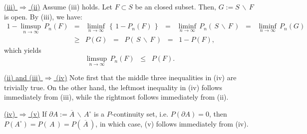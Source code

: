 \vskip 0.3cm
\noindent
\underline{(iii) $\Longrightarrow$ (ii)}
\vskip 0.2cm
\noindent
Assume (iii) holds. Let $F \subset S$ be an closed subset.
Then, $G := S\,\backslash\,F$ is open. By (iii), we have:
\begin{eqnarray*}
1 - \limsup_{n\rightarrow\infty}\,P_{n}\!\left(F\right)
&=& \liminf_{n\rightarrow\infty}\,\left\{\,1 - P_{n}\!\left(F\right)\,\right\}
\;\;=\;\;\liminf_{n\rightarrow\infty}\,P_{n}\!\left(\,S\,\backslash\,F\,\right)
\;\;=\;\;\liminf_{n\rightarrow\infty}\,P_{n}(G)
\\
&\geq& P\!\left(G\right)
\;\;=\;\; P\!\left(\,S\,\backslash\,F\,\right)
\;\;=\;\; 1 - P\!\left(F\right),
\end{eqnarray*}
which yields
\begin{equation}
\limsup_{n\rightarrow\infty}\,P_{n}\!\left(F\right)
\;\;\leq\;\; P\!\left(F\right).
\end{equation}

\vskip 0.3cm
\noindent
\underline{(ii) and (iii) $\Longrightarrow$ (iv)}
\vskip 0.2cm
\noindent
Note first that the middle three inequalities in (iv) are trivially true.
On the other hand, the leftmost inequality in (iv) follows immediately from (iii),
while the rightmost follows immediately from (ii).

\mbox{}
\vskip 0.3cm
\noindent
\underline{(iv) $\Longrightarrow$ (v)}
\vskip 0.2cm
\noindent
If $\partial A := \overline{A}\,\backslash\,A^{\circ}$ is a $P$-continuity set,
i.e. $P\!\left(\partial A\right) = 0$, then
$P\!\left(A^{\circ}\right) = P\!\left(\,A\,\right) = P\!\left(\,\overline{A}\,\right)$,
in which case, (v) follows immediately from (iv).

